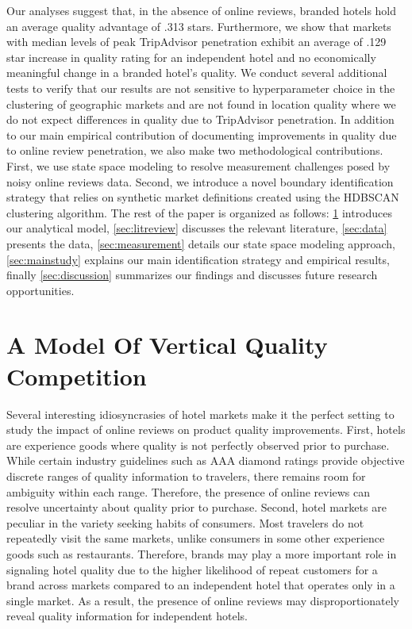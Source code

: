 \documentclass[mksc,blindrev]{informs3} %
\begin{document}
Our analyses suggest that, in the absence of online reviews, branded hotels hold an average quality advantage of .313 stars. Furthermore, we show that markets with median levels of peak TripAdvisor penetration exhibit an average of .129 star increase in quality rating for an independent hotel and no economically meaningful change in a branded hotel's quality. We conduct several additional tests to verify that our results are not sensitive to hyperparameter choice in the clustering of geographic markets and are not found in location quality where we do not expect differences in quality due to TripAdvisor penetration. In addition to our main empirical contribution of documenting improvements in quality due to online review penetration, we also make two methodological contributions. First, we use state space modeling to resolve measurement challenges posed by noisy online reviews data. Second, we introduce a novel boundary identification strategy that relies on synthetic market definitions created using the HDBSCAN clustering algorithm. The rest of the paper is organized as follows: \cref{sec:theory} introduces our analytical model, \cref{sec:litreview} discusses the relevant literature, \cref{sec:data} presents the data, \cref{sec:measurement} details our state space modeling approach, \cref{sec:mainstudy} explains our main identification strategy and empirical results, finally \cref{sec:discussion} summarizes our findings and discusses future research opportunities.

\section{A Model Of Vertical Quality Competition} \label{sec:theory}

Several interesting idiosyncrasies of hotel markets make it the perfect setting to study the impact of online reviews on product quality improvements. First, hotels are experience goods where quality is not perfectly observed prior to purchase. While certain industry guidelines such as AAA diamond ratings provide objective discrete ranges of quality information to travelers, there remains room for ambiguity within each range. Therefore, the presence of online reviews can resolve uncertainty about quality prior to purchase. Second, hotel markets are peculiar in the variety seeking habits of consumers. Most travelers do not repeatedly visit the same markets, unlike consumers in some other experience goods such as restaurants. Therefore, brands may play a more important role in signaling hotel quality due to the higher likelihood of repeat customers for a brand across markets compared to an independent hotel that operates only in a single market. As a result, the presence of online reviews may disproportionately reveal quality information for independent hotels.
\end{document}
